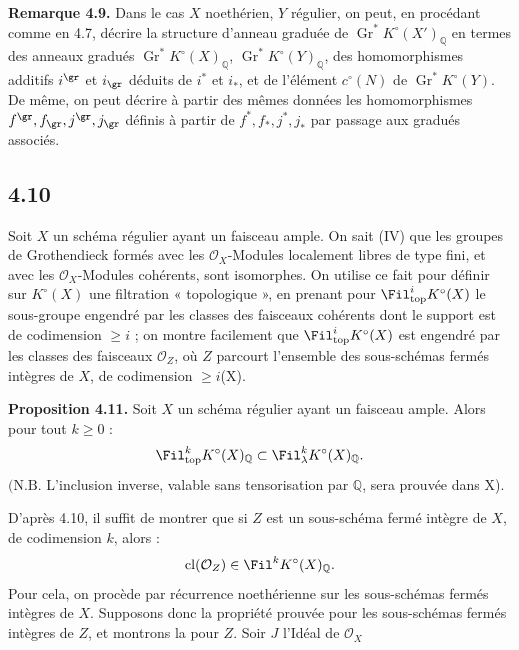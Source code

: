 \textbf{Remarque 4.9.} Dans le cas \(X\) noethérien, \(Y\) régulier, on peut, en procédant comme en 4.7, décrire la structure d'anneau graduée de \(\operatorname{Gr}^*K^\circ(X')_{\mathbb Q}\) en termes des anneaux gradués \(\operatorname{Gr}^*K^\circ(X)_{\mathbb Q}\), \(\operatorname{Gr}^*K^\circ(Y)_{\mathbb Q}\), des homomorphismes additifs \(i^{\gr}\) et \(i_{\gr}\) déduits de \(i^*\) et \(i_*\), et de l'élément \(c^\circ(N)\) de \(\operatorname{Gr}^*K^\circ(Y)\). De même, on peut décrire à partir des mêmes données les homomorphismes \(f^{\gr},f_{\gr},j^{\gr},j_{\gr}\) définis à partir de \(f^*,f_*,j^*,j_*\) par passage aux gradués associés.

\subsection*{4.10}

Soit \(X\) un schéma régulier ayant un faisceau ample. On sait (IV\qquad) que les groupes de Grothendieck formés avec les \(\mathcal O_X\)-Modules localement libres de type fini, et avec les \(\mathcal O_X\)-Modules cohérents, sont isomorphes. On utilise ce fait pour définir sur \(K^\circ(X)\) une filtration « topologique », en prenant pour \(\Fil^i_{\mathrm{top}}K^\circ(X)\) le sous-groupe engendré par les classes des faisceaux cohérents dont le support est de codimension \(\ge i\) ; on montre facilement que \(\Fil^i_{\mathrm{top}}K^\circ(X)\) est engendré par les classes des faisceaux \(\mathcal O_Z\), où \(Z\) parcourt l'ensemble des sous-schémas fermés intègres de \(X\), de codimension \(\ge i\)(X\qquad).

\textbf{Proposition 4.11.} Soit \(X\) un schéma régulier ayant un faisceau ample. Alors pour tout \(k\ge0\) :
\[
  \Fil_{\mathrm{top}}^kK^\circ(X)_{\mathbb Q}
  \subset
  \Fil_\lambda^kK^\circ(X)_{\mathbb Q}.
\]
\((\mathrm{N.B.}\) L'inclusion inverse, valable sans tensorisation par \(\mathbb Q\), sera prouvée dans X\qquad).

D'après 4.10, il suffit de montrer que si \(Z\) est un sous-schéma fermé intègre de \(X\), de codimension \(k\), alors :
\[
  \operatorname{cl}(\mathcal O_Z)\in\Fil^kK^\circ(X)_{\mathbb Q}.
\]
Pour cela, on procède par récurrence noethérienne sur les sous-schémas fermés intègres de \(X\). Supposons donc la propriété prouvée pour les sous-schémas fermés intègres de \(Z\), et montrons la pour \(Z\). Soir \(J\) l'Idéal de \(\mathcal O_X\)
